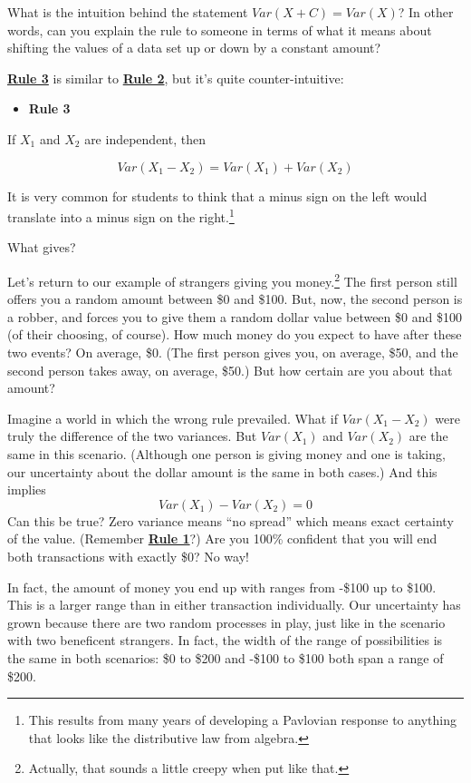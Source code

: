 \documentclass[
]{book}
\providecommand{\tightlist}{%
  \setlength{\itemsep}{0pt}\setlength{\parskip}{0pt}}
\begin{document}
What is the intuition behind the statement \(Var\left(X + C\right) = Var\left(X\right)\)? In other words, can you explain the rule to someone in terms of what it means about shifting the values of a data set up or down by a constant amount?

\protect\hyperlink{Rule3}{\textbf{Rule 3}} is similar to \protect\hyperlink{Rule2}{\textbf{Rule 2}}, but it's quite counter-intuitive:

\begin{itemize}
\tightlist
\item
  \textbf{Rule 3}
\end{itemize}

If \(X_{1}\) and \(X_{2}\) are independent, then

\[
Var\left(X_{1} - X_{2}\right) =
Var\left(X_{1}\right) + Var\left(X_{2}\right)
\]

It is very common for students to think that a minus sign on the left would translate into a minus sign on the right.\footnote{This results from many years of developing a Pavlovian response to anything that looks like the distributive law from algebra.}

What gives?

Let's return to our example of strangers giving you money.\footnote{Actually, that sounds a little creepy when put like that.} The first person still offers you a random amount between \$0 and \$100. But, now, the second person is a robber, and forces you to give them a random dollar value between \$0 and \$100 (of their choosing, of course). How much money do you expect to have after these two events? On average, \$0. (The first person gives you, on average, \$50, and the second person takes away, on average, \$50.) But how certain are you about that amount?

Imagine a world in which the wrong rule prevailed. What if \(Var\left(X_{1} - X_{2}\right)\) were truly the difference of the two variances. But \(Var\left(X_{1}\right)\) and \(Var\left(X_{2}\right)\) are the same in this scenario. (Although one person is giving money and one is taking, our uncertainty about the dollar amount is the same in both cases.) And this implies
\[
Var\left(X_{1}\right) - Var\left(X_{2}\right) = 0
\]
Can this be true? Zero variance means ``no spread'' which means exact certainty of the value. (Remember \protect\hyperlink{Rule1}{\textbf{Rule 1}}?) Are you 100\% confident that you will end both transactions with exactly \$0? No way!

In fact, the amount of money you end up with ranges from -\$100 up to \$100. This is a larger range than in either transaction individually. Our uncertainty has grown because there are two random processes in play, just like in the scenario with two beneficent strangers. In fact, the width of the range of possibilities is the same in both scenarios: \$0 to \$200 and -\$100 to \$100 both span a range of \$200.
\end{document}
